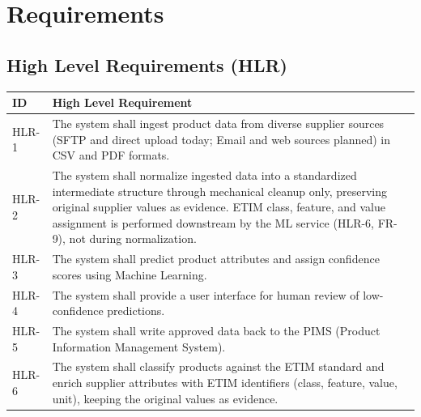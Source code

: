 \documentclass[12pt, a4paper]{article}
\begin{document}
\newpage
\section{Requirements}

\subsection{High Level Requirements (HLR)}
\begin{tabular}{@{}lp{12cm}@{}}
\toprule
\textbf{ID} & \textbf{High Level Requirement} \\
\midrule
HLR-1 & The system shall ingest product data from diverse supplier sources (SFTP and direct upload today; Email and web sources planned) in CSV and PDF formats. \\
\addlinespace
HLR-2 & The system shall normalize ingested data into a standardized intermediate structure through mechanical cleanup only, preserving original supplier values as evidence. ETIM class, feature, and value assignment is performed downstream by the ML service (HLR-6, FR-9), not during normalization. \\
\addlinespace
HLR-3 & The system shall predict product attributes and assign confidence scores using Machine Learning. \\
\addlinespace
HLR-4 & The system shall provide a user interface for human review of low-confidence predictions. \\
\addlinespace
HLR-5 & The system shall write approved data back to the PIMS (Product Information Management System). \\
\addlinespace
HLR-6 & The system shall classify products against the ETIM standard and enrich supplier attributes with ETIM identifiers (class, feature, value, unit), keeping the original values as evidence. \\
\bottomrule
\end{tabular}
\end{document}
